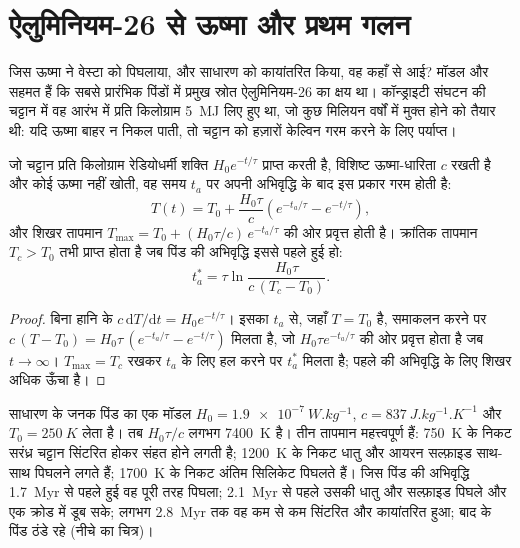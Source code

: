 \section{ऐलुमिनियम-26 से ऊष्मा और प्रथम गलन}

जिस ऊष्मा ने वेस्टा को पिघलाया, और साधारण  को कायांतरित किया, वह
कहाँ से आई? मॉडल और  सहमत हैं कि सबसे प्रारंभिक पिंडों में
प्रमुख स्रोत ऐलुमिनियम-26 का क्षय था। कॉन्ड्राइटी संघटन की चट्टान में वह आरंभ में
प्रति किलोग्राम \qty{5}{MJ} लिए हुए था, जो कुछ मिलियन वर्षों में मुक्त होने को तैयार थी:
यदि ऊष्मा बाहर न निकल पाती, तो चट्टान को हज़ारों केल्विन गरम करने के लिए पर्याप्त।

\begin{proposition}[ऐलुमिनियम-26 द्वारा ग्रहाणु का ऊष्मन]
\label{prop:b2:planet-formation-meteorites:heating}
जो चट्टान प्रति किलोग्राम रेडियोधर्मी शक्ति $H_0 e^{-t/\tau}$ प्राप्त करती है,
विशिष्ट ऊष्मा-धारिता $c$ रखती है और कोई ऊष्मा नहीं खोती, वह समय $t_a$ पर अपनी अभिवृद्धि के
बाद इस प्रकार गरम होती है:
\[
  T(t) = T_0 + \frac{H_0\tau}{c}\left(e^{-t_a/\tau} - e^{-t/\tau}\right),
\]
और शिखर तापमान
$T_{\max} = T_0 + (H_0\tau/c)\,e^{-t_a/\tau}$ की ओर प्रवृत्त होती है। क्रांतिक तापमान
$T_c > T_0$ तभी प्राप्त होता है जब पिंड की अभिवृद्धि इससे पहले हुई हो:
\[
  t_a^* = \tau\ln\frac{H_0\tau}{c\,(T_c - T_0)}.
\]
\end{proposition}

\begin{proof}
बिना हानि के $c\,\mathrm dT/\mathrm dt = H_0 e^{-t/\tau}$। इसका
$t_a$ से, जहाँ $T = T_0$ है, समाकलन करने पर
$c\,(T - T_0) = H_0\tau\,(e^{-t_a/\tau} - e^{-t/\tau})$ मिलता है, जो $H_0\tau e^{-t_a/\tau}$
की ओर प्रवृत्त होता है जब $t \to \infty$। $T_{\max} = T_c$ रखकर
$t_a$ के लिए हल करने पर $t_a^*$ मिलता है; पहले की अभिवृद्धि के लिए शिखर अधिक ऊँचा है।
\end{proof}

साधारण  के जनक पिंड का एक मॉडल
$H_0 = \qty{1.9e-7}{W.kg^{-1}}$, $c = \qty{837}{J.kg^{-1}.K^{-1}}$ और
$T_0 = \qty{250}{K}$ लेता है। तब $H_0\tau/c$ लगभग \qty{7400}{K} है। तीन
तापमान महत्त्वपूर्ण हैं: \qty{750}{K} के निकट सरंध्र चट्टान सिंटरित होकर
संहत होने लगती है; \qty{1200}{K} के निकट धातु और आयरन सल्फ़ाइड साथ-साथ पिघलने
लगते हैं; \qty{1700}{K} के निकट अंतिम सिलिकेट पिघलते हैं। जिस पिंड की अभिवृद्धि
\qty{1.7}{Myr} से पहले हुई वह पूरी तरह पिघला; \qty{2.1}{Myr} से पहले उसकी धातु और सल्फ़ाइड
पिघले और एक क्रोड में डूब सके; लगभग \qty{2.8}{Myr} तक वह कम से कम
सिंटरित और कायांतरित हुआ; बाद के पिंड ठंडे रहे (नीचे का चित्र)।

